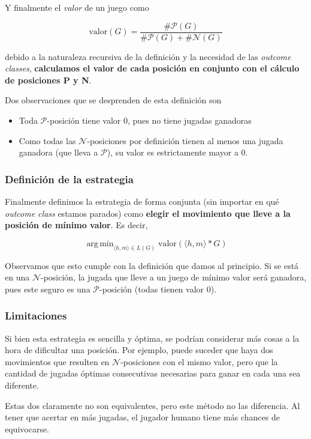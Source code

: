 \documentclass{article}
\DeclareMathOperator*{\argmin}{arg\,min}
\newcommand{\calP}{$\mathcal{P}$}
\newcommand{\pPosition}{\calP{}-posición}
\newcommand{\calN}{$\mathcal{N}$}
\newcommand{\nPosition}{\calN{}-posición}
\newcommand{\nPositions}{\calN{}-posiciones}
\newcommand{\nimTuple}[2]{\langle #1, #2\rangle}
\begin{document}
Y finalmente el \textit{valor} de un juego como

\[
    \text{valor}(G) = \frac{\# \text{\calP}(G)}{\# \text{\calP}(G) + \# \text{\calN}(G)}
\]

debido a la naturaleza recursiva de la definición y la necesidad de las \textit{outcome classes}, \textbf{calculamos el valor de cada posición en conjunto con el cálculo de posiciones P y N}.

Dos observaciones que se desprenden de esta definición son

\begin{itemize}
    \item Toda \pPosition{} tiene valor 0, pues no tiene jugadas ganadoras
    \item Como todas las \nPositions{} por definición tienen al menos una jugada ganadora (que lleva a \calP{}), su valor es estrictamente mayor a 0.
\end{itemize}

\subsubsection*{Definición de la estrategia}

Finalmente definimos la estrategia de forma conjunta (sin importar en qué \textit{outcome class} estamos parados) como \textbf{elegir el movimiento que lleve a la posición de mínimo valor}. Es decir,

\[
\argmin_{\nimTuple{h}{m} \in L(G)} \text{valor}(\nimTuple{h}{m} \ast G)
\]

Observamos que esto cumple con la definición que damos al principio. Si se está en una \nPosition{}, la jugada que lleve a un juego de mínimo valor será ganadora, pues este seguro es una \pPosition{} (todas tienen valor 0).

\subsubsection*{Limitaciones}

Si bien esta estrategia es sencilla y óptima, se podrían considerar más cosas a la hora de dificultar una posición. Por ejemplo, puede suceder que haya dos movimientos que resulten en \nPositions{} con el mismo valor, pero que la cantidad de jugadas óptimas consecutivas necesarias para ganar en cada una sea diferente. 

Estas dos claramente no son equivalentes, pero este método no las diferencia. Al tener que acertar en más jugadas, el jugador humano tiene más chances de equivocarse.
\end{document}
